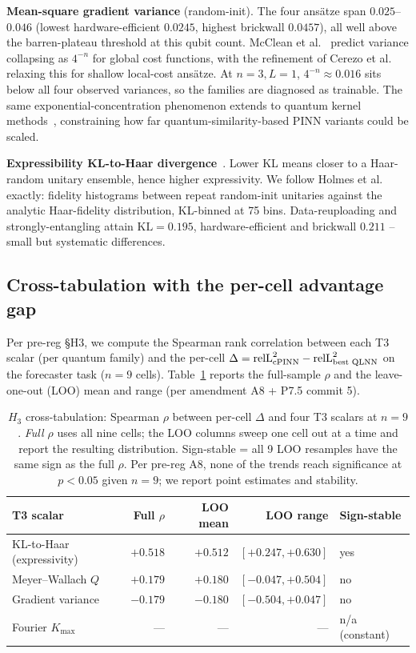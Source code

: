 \textbf{Mean-square gradient variance} (random-init). The four ansätze
span $0.025$--$0.046$ (lowest hardware-efficient $0.0245$, highest
brickwall $0.0457$), all well above the barren-plateau threshold at
this qubit count. McClean et al.~\cite{mcclean2018barren} predict
variance collapsing as $4^{-n}$ for global cost functions, with the
refinement of Cerezo et al.~\cite{cerezo2021cost} relaxing this for
shallow local-cost ansätze. At $n=3, L=1$, $4^{-n} \approx 0.016$ sits
below all four observed variances, so the families are diagnosed as
trainable. The same exponential-concentration phenomenon extends to
quantum kernel methods~\cite{thanasilp2024exponential}, constraining
how far quantum-similarity-based PINN variants could be scaled.

\textbf{Expressibility KL-to-Haar
divergence}~\cite{holmes2022connecting}.
Lower KL means closer to a Haar-random unitary ensemble, hence higher
expressivity. We follow Holmes et al.\cite{holmes2022connecting}
exactly: fidelity histograms between repeat random-init unitaries
against the analytic Haar-fidelity distribution, KL-binned at 75 bins.
Data-reuploading and strongly-entangling attain $\mathrm{KL} = 0.195$,
hardware-efficient and brickwall $0.211$ -- small but systematic
differences.

\subsection{Cross-tabulation with the per-cell advantage gap}
\label{sec:mechanism-h3}

Per pre-reg \S H3, we compute the Spearman rank correlation
between each T3 scalar (per quantum family) and the per-cell
$\Delta = \mathrm{relL}^2_\text{cPINN} - \mathrm{relL}^2_\text{best QLNN}$
on the forecaster task ($n=9$ cells). Table~\ref{tab:h3} reports
the full-sample $\rho$ and the leave-one-out (LOO) mean and
range (per amendment A8 + P7.5 commit 5).

\begin{table}[t]
\centering
\caption{$H_3$ cross-tabulation: Spearman $\rho$ between per-cell
$\Delta$ and four T3 scalars at $n=9$. \textit{Full $\rho$} uses
all nine cells; the LOO columns sweep one cell out at a time and
report the resulting distribution. Sign-stable = all 9 LOO
resamples have the same sign as the full $\rho$. Per pre-reg
A8, none of the trends reach significance at $p<0.05$ given
$n=9$; we report point estimates and stability.}
\label{tab:h3}
\small
\begin{tabular}{lrrrl}
\toprule
T3 scalar & Full $\rho$ & LOO mean & LOO range &
Sign-stable \\
\midrule
KL-to-Haar (expressivity) & $+0.518$ & $+0.512$ & $[+0.247,+0.630]$ & yes \\
Meyer--Wallach $Q$ & $+0.179$ & $+0.180$ & $[-0.047,+0.504]$ & no \\
Gradient variance & $-0.179$ & $-0.180$ & $[-0.504,+0.047]$ & no \\
Fourier $K_{\max}$ & --- & --- & --- & n/a (constant) \\
\bottomrule
\end{tabular}
\end{table}

